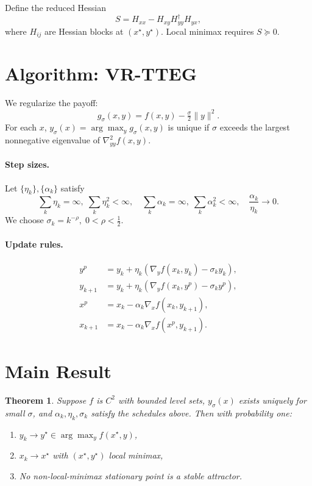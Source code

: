 \documentclass[11pt]{article}
\newtheorem{theorem}{Theorem}
\begin{document}
Define the reduced Hessian
\[
S = H_{xx} - H_{xy}H_{yy}^\dagger H_{yx},
\]
where $H_{ij}$ are Hessian blocks at $(x^\star,y^\star)$. Local minimax requires $S\succeq 0$.

\section{Algorithm: VR-TTEG}
We regularize the payoff:
\[
g_\sigma(x,y)=f(x,y)-\tfrac{\sigma}{2}\|y\|^2.
\]
For each $x$, $y_\sigma(x)=\arg\max_y g_\sigma(x,y)$ is unique if $\sigma$ exceeds the largest nonnegative eigenvalue of $\nabla^2_{yy} f(x,y)$.

\paragraph{Step sizes.}
Let $\{\eta_k\},\{\alpha_k\}$ satisfy
\[
\sum_k \eta_k=\infty,\;\sum_k \eta_k^2<\infty,\quad 
\sum_k \alpha_k=\infty,\;\sum_k \alpha_k^2<\infty,\quad
\frac{\alpha_k}{\eta_k}\to 0.
\]
We choose $\sigma_k=k^{-\rho},\;0<\rho<\tfrac{1}{2}$.

\paragraph{Update rules.}
\begin{align*}
y^p &= y_k + \eta_k(\nabla_y f(x_k,y_k)-\sigma_k y_k),\\
y_{k+1} &= y_k + \eta_k(\nabla_y f(x_k,y^p)-\sigma_k y^p),\\
x^p &= x_k - \alpha_k \nabla_x f(x_k,y_{k+1}),\\
x_{k+1} &= x_k - \alpha_k \nabla_x f(x^p,y_{k+1}).
\end{align*}

\section{Main Result}

\begin{theorem}
Suppose $f$ is $C^2$ with bounded level sets, $y_\sigma(x)$ exists uniquely for small $\sigma$, and $\alpha_k,\eta_k,\sigma_k$ satisfy the schedules above. Then with probability one:
\begin{enumerate}
    \item $y_k \to y^\star \in \arg\max_y f(x^\star,y)$,
    \item $x_k \to x^\star$ with $(x^\star,y^\star)$ local minimax,
    \item No non-local-minimax stationary point is a stable attractor.
\end{enumerate}
\end{theorem}
\end{document}
